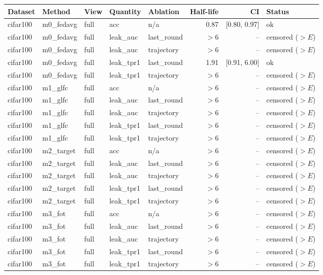 \begin{tabular}{lllllrrl}
\toprule
Dataset & Method & View & Quantity & Ablation & Half-life & CI & Status \\
\midrule
cifar100 & m0\_fedavg & full & acc & n/a & 0.87 & [0.80, 0.97] & ok \\
cifar100 & m0\_fedavg & full & leak\_auc & last\_round & $>$6 & -- & censored ($>E$) \\
cifar100 & m0\_fedavg & full & leak\_auc & trajectory & $>$6 & -- & censored ($>E$) \\
cifar100 & m0\_fedavg & full & leak\_tpr1 & last\_round & 1.91 & [0.91, 6.00] & ok \\
cifar100 & m0\_fedavg & full & leak\_tpr1 & trajectory & $>$6 & -- & censored ($>E$) \\
cifar100 & m1\_glfc & full & acc & n/a & $>$6 & -- & censored ($>E$) \\
cifar100 & m1\_glfc & full & leak\_auc & last\_round & $>$6 & -- & censored ($>E$) \\
cifar100 & m1\_glfc & full & leak\_auc & trajectory & $>$6 & -- & censored ($>E$) \\
cifar100 & m1\_glfc & full & leak\_tpr1 & last\_round & $>$6 & -- & censored ($>E$) \\
cifar100 & m1\_glfc & full & leak\_tpr1 & trajectory & $>$6 & -- & censored ($>E$) \\
cifar100 & m2\_target & full & acc & n/a & $>$6 & -- & censored ($>E$) \\
cifar100 & m2\_target & full & leak\_auc & last\_round & $>$6 & -- & censored ($>E$) \\
cifar100 & m2\_target & full & leak\_auc & trajectory & $>$6 & -- & censored ($>E$) \\
cifar100 & m2\_target & full & leak\_tpr1 & last\_round & $>$6 & -- & censored ($>E$) \\
cifar100 & m2\_target & full & leak\_tpr1 & trajectory & $>$6 & -- & censored ($>E$) \\
cifar100 & m3\_fot & full & acc & n/a & $>$6 & -- & censored ($>E$) \\
cifar100 & m3\_fot & full & leak\_auc & last\_round & $>$6 & -- & censored ($>E$) \\
cifar100 & m3\_fot & full & leak\_auc & trajectory & $>$6 & -- & censored ($>E$) \\
cifar100 & m3\_fot & full & leak\_tpr1 & last\_round & $>$6 & -- & censored ($>E$) \\
cifar100 & m3\_fot & full & leak\_tpr1 & trajectory & $>$6 & -- & censored ($>E$) \\

\end{tabular}
